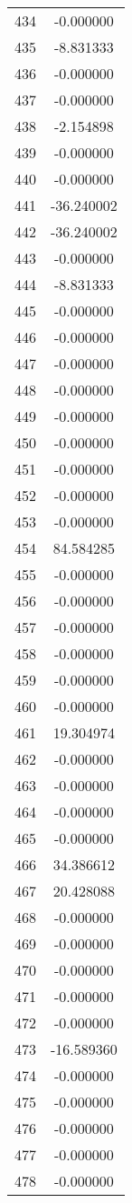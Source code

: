 \documentclass[12pt]{article}
\begin{document}
\begin{longtable}{@{}cc@{}}
434 & -0.000000 \\
435 & -8.831333 \\
436 & -0.000000 \\
437 & -0.000000 \\
438 & -2.154898 \\
439 & -0.000000 \\
440 & -0.000000 \\
441 & -36.240002 \\
442 & -36.240002 \\
443 & -0.000000 \\
444 & -8.831333 \\
445 & -0.000000 \\
446 & -0.000000 \\
447 & -0.000000 \\
448 & -0.000000 \\
449 & -0.000000 \\
450 & -0.000000 \\
451 & -0.000000 \\
452 & -0.000000 \\
453 & -0.000000 \\
454 & 84.584285 \\
455 & -0.000000 \\
456 & -0.000000 \\
457 & -0.000000 \\
458 & -0.000000 \\
459 & -0.000000 \\
460 & -0.000000 \\
461 & 19.304974 \\
462 & -0.000000 \\
463 & -0.000000 \\
464 & -0.000000 \\
465 & -0.000000 \\
466 & 34.386612 \\
467 & 20.428088 \\
468 & -0.000000 \\
469 & -0.000000 \\
470 & -0.000000 \\
471 & -0.000000 \\
472 & -0.000000 \\
473 & -16.589360 \\
474 & -0.000000 \\
475 & -0.000000 \\
476 & -0.000000 \\
477 & -0.000000 \\
478 & -0.000000 \\

\end{longtable}
\end{document}
